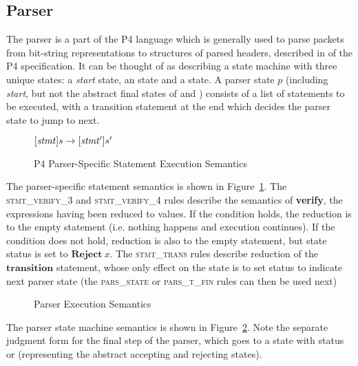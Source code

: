 \documentclass[UTF8]{article}
\begin{document}
\newcommand{\start}{\textit{start}}
\subsection{Parser}
The parser is a part of the P4 language which is generally used to parse packets from bit-string representations to structures of parsed headers, described in  of the P4 specification. It can be thought of as describing a state machine with three unique states: a \start{} state, an \accept{} state and a \reject{\msg{}} state. A parser state $p$ (including \start{}, but not the abstract final states of \accept{} and \reject{\msg{}}) consists of a list of statements to be executed, with a transition statement at the end which decides the parser state to jump to next.

\begin{figure}[ht!]
\begin{ottdefnblock}{$[  \mathit{stmt}  ]  s  \rightarrow  [  \mathit{stmt'}  ]  s'$}{}
\ottusedrule{\ottdrulestmtXXverifyXXThree{}}
\ottusedrule{\ottdrulestmtXXverifyXXFour{}}
\ottusedrule{\ottdrulestmtXXtransXXOne{}}
\ottusedrule{\ottdrulestmtXXtransXXTwo{}}
\ottusedrule{\ottdrulestmtXXtransXXThree{}}
\end{ottdefnblock}
\caption{P4 Parser-Specific Statement Execution Semantics}
\label{fig:parssemstmtexec}
\end{figure}

The parser-specific statement semantics is shown in Figure~\ref{fig:parssemstmtexec}. The \textsc{stmt\_verify\_3} and \textsc{stmt\_verify\_4} rules describe the semantics of \textbf{verify}, the expressions having been reduced to values. If the condition holds, the reduction is to the empty statement (i.e. nothing happens and execution continues). If the condition does not hold, reduction is also to the empty statement, but state status is set to $\mathbf{Reject}\ x$. The \textsc{stmt\_trans} rules describe reduction of the $\mathbf{transition}$ statement, whose only effect on the state is to set status to indicate next parser state (the \textsc{pars\_state} or \textsc{pars\_t\_fin} rules can then be used next)

\begin{figure}[ht!]
\ottdefnsparsXXsem
\ottdefnsparsXXtXXsem
\caption{Parser Execution Semantics}
\label{fig:semparsexec}
\end{figure}

The parser state machine semantics is shown in Figure~\ref{fig:semparsexec}. Note the separate judgment form for the final step of the parser, which goes to a state with status \accept{} or \reject{} (representing the abstract accepting and rejecting states).
\end{document}

